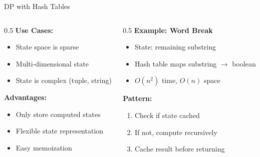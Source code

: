 \documentclass[aspectratio=169,xcolor=dvipsnames]{beamer}
\begin{document}
\begin{frame}{DP with Hash Tables}
  \begin{columns}
    \begin{column}{0.5\textwidth}
      \textbf{Use Cases:}
      \begin{itemize}
        \item State space is sparse
        \item Multi-dimensional state
        \item State is complex (tuple, string)
      \end{itemize}

      \vspace{0.3cm}
      \textbf{Advantages:}
      \begin{itemize}
        \item Only store computed states
        \item Flexible state representation
        \item Easy memoization
      \end{itemize}
    \end{column}

    \begin{column}{0.5\textwidth}
      \textbf{Example: Word Break}
      \begin{itemize}
        \item State: remaining substring
        \item Hash table maps substring $\to$ boolean
        \item $O(n^2)$ time, $O(n)$ space
      \end{itemize}

      \vspace{0.3cm}
      \textbf{Pattern:}
      \begin{enumerate}
        \item Check if state cached
        \item If not, compute recursively
        \item Cache result before returning
      \end{enumerate}
    \end{column}
  \end{columns}
\end{frame}
\end{document}
